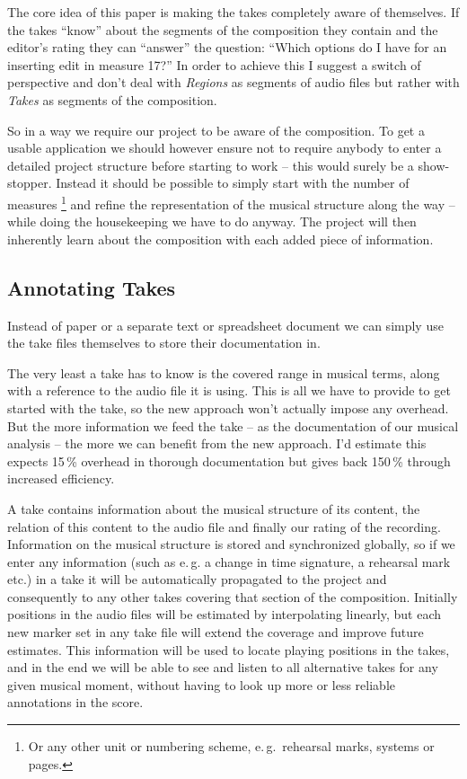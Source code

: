 \documentclass[11pt,a4paper]{article}
\begin{document}
The core idea of this paper is making the takes completely aware of themselves.
If the takes “know” about the segments of the composition they contain and the editor's rating they can “answer” the question: “Which options do I have for an inserting edit in measure 17?”
In order to achieve this I suggest a switch of perspective and don't deal with \emph{Regions} as segments of audio files but rather with \emph{Takes} as segments of the composition.

So in a way we require our project to be aware of the composition.
To get a usable application we should however ensure not to require anybody to enter a detailed project structure before starting to work -- this would surely be a show-stopper.
Instead it should be possible to simply start with the number of measures%
\footnote{Or any other unit or numbering scheme, e.\,g.\ rehearsal marks, systems or pages.}
and refine the representation of the musical structure along the way -- while doing the housekeeping we have to do anyway.
The project will then inherently learn about the composition with each added piece of information.

\subsection{Annotating Takes}
Instead of paper or a separate text or spreadsheet document we can simply use the take files themselves to store their documentation in.

The very least a take has to know is the covered range in musical terms, along with a reference to the audio file it is using.
This is all we have to provide to get started with the take, so the new approach won't actually impose any overhead.
But the more information we feed the take -- as the documentation of our musical analysis -- the more we can benefit from the new approach.
I'd estimate this expects 15\,\% overhead in thorough documentation but gives back 150\,\% through increased efficiency.

A take contains information about the musical structure of its content, the relation of this content to the audio file and finally our rating of the recording.
Information on the musical structure is stored and synchronized globally, so if we enter any information (such as e.\,g. a change in time signature, a rehearsal mark etc.) in a take it will be automatically propagated to the project and consequently to any other takes covering that section of the composition.
Initially positions in the audio files will be estimated by interpolating linearly, but each new marker set in any take file will extend the coverage and improve future estimates.
This information will be used to locate playing positions in the takes, and in the end we will be able to see and listen to all alternative takes for any given musical moment, without having to look up more or less reliable annotations in the score.
\end{document}
